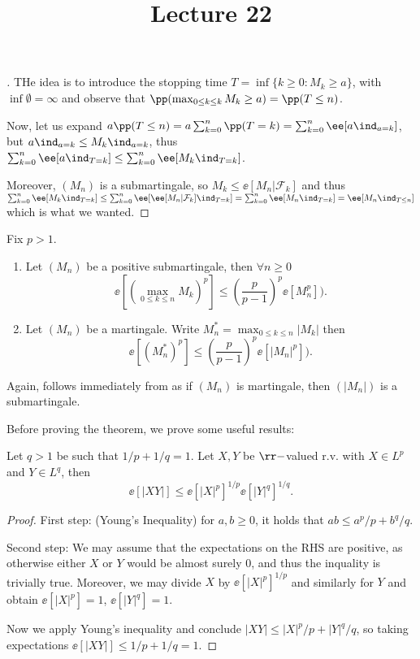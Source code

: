 \documentclass[../main.tex]{subfiles}
\title{Lecture 22}
\begin{document}
\begin{proof}[]
  THe idea is to introduce the stopping time $T = \inf \{ k \geq 0 \colon M_k
  \geq a \} $, with $\inf \emptyset = \infty$ and observe that
  $\pp(\max_{0 \leq k \leq k} M_k \geq a) = \pp(T \leq n)$.

  Now, let us expand $a \pp(T \leq n) = a \sum_{k=0}^n  \pp(T = k) =
  \sum_{k=0}^n \ee[a \ind_{a = k}]$, but $a \ind_{a = k} \leq M_k \ind_{a =
  k}$, thus $\sum_{k=0}^n \ee[a \ind_{T = k}] \leq \sum_{k=0}^n \ee[M_k
  \ind_{T = k}]$.

  Moreover, $(M_n)$ is a submartingale, so $M_k \leq \ee[M_n | \mathcal{F}_k]$
  and thus $\sum_{k=0}^n \ee[M_k \ind_{T = k}] \leq \sum_{k=0}^n \ee[\ee[M_n |
  \mathcal{F}_k] \ind_{T = k}] = \sum_{k=0}^n \ee[M_n \ind_{T = k}] = \ee[M_n
  \ind_{T \leq n}]$ which is what we wanted.
\end{proof}

\begin{theorem}
  Fix $p > 1$.

  \begin{enumerate}
    \item Let $(M_n)$ be a positive submartingale, then $\forall n \geq 0$
      \[
        \ee[(\max_{0 \leq k \leq n} M_k)^p] \leq \left( \frac{p}{p-1}
        \right)^p \ee[M_n^p] )
      .\] 
    \item Let $(M_n)$ be a martingale. Write $M_n^* = \max_{0 \leq k \leq n}
      |M_k|$ then
      \[
        \ee[(M_n^*)^p] \leq \left( \frac{p}{p-1}
        \right)^p \ee[|M_n|^p] )
      .\] 
  \end{enumerate}
\end{theorem}
\begin{remark}
  Again,  follows immediately from  as if $(M_n)$ is
  martingale, then $(|M_n|)$ is a submartingale.
\end{remark}

Before proving the theorem, we prove some useful results:

\begin{lemma}
  Let $q > 1$ be such that $1/p + 1/q = 1$. Let $X, Y$ be $\rr-$valued r.v.
  with $X \in L^p$ and $Y \in L^q$, then
  \[
    \ee[|XY|] \leq \ee[|X|^p]^{1/p} \ee[|Y|^q]^{1/q} 
  .\] 
\end{lemma}
\begin{proof}
  First step: (Young's Inequality) for $a, b \geq 0$, it holds that $ab \leq a^p/p + b^q/q$.

    Second step: We may assume that the expectations on the RHS are positive,
    as otherwise either $X$ or $Y$ would be almost surely $0$, and thus the
    inquality is trivially true. Moreover, we may divide $X$ by
    $\ee[|X|^p]^{1/p}$ and similarly for $Y$ and obtain $\ee[|X|^p] = 1$,
    $\ee[|Y|^q] = 1$.

    Now we apply Young's inequality and conclude $|XY| \leq |X|^p/p +
    |Y|^q/q$, so taking expectations $\ee[|XY|] \leq 1/p + 1/q = 1$.
\end{proof}
\end{document}
